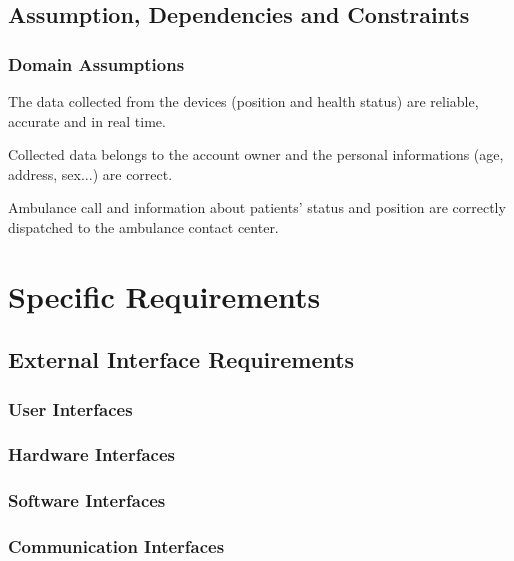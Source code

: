 \documentclass[a4paper]{article}
\begin{document}
\subsection{Assumption, Dependencies and Constraints}

\subsubsection{Domain Assumptions}


\begin{enumerate}[label={[D.\arabic*]}]
    
    \item The data collected from the devices (position and health status) are reliable, accurate and in real time.
    \item Collected data belongs to the account owner and the personal informations (age, address, sex...) are correct.
    \item Ambulance call and information about patients' status and position are correctly dispatched to the ambulance contact center.
    
    
\end{enumerate}


\section{Specific Requirements}

\subsection{External Interface Requirements}

\subsubsection{User Interfaces}

\subsubsection{Hardware Interfaces}

\subsubsection{Software Interfaces}

\subsubsection{Communication Interfaces}
\end{document}
